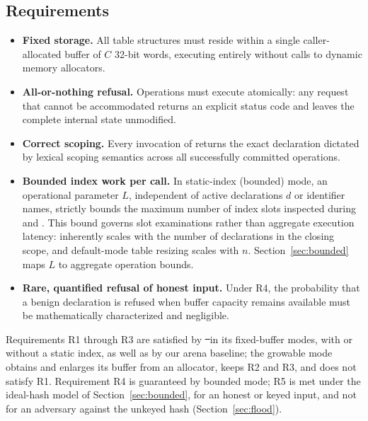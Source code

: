\subsection{Requirements}
\label{sec:requirements}
\begin{itemize}
\item[R1] \textbf{Fixed storage.} All table structures must reside within a single caller-allocated buffer of $C$ 32-bit words, executing entirely without calls to dynamic memory allocators.
\item[R2] \textbf{All-or-nothing refusal.} Operations must execute atomically: any request that cannot be accommodated returns an explicit status code and leaves the complete internal state unmodified.
\item[R3] \textbf{Correct scoping.} Every invocation of  returns the exact declaration dictated by lexical scoping semantics across all successfully committed operations.
\item[R4] \textbf{Bounded index work per call.} In static-index (bounded) mode, an operational parameter $L$, independent of active declarations $d$ or identifier names, strictly bounds the maximum number of index slots inspected during  and . This bound governs slot examinations rather than aggregate execution latency:  inherently scales with the number of declarations in the closing scope, and default-mode table resizing scales with $n$. Section~\ref{sec:bounded} maps $L$ to aggregate operation bounds.
\item[R5] \textbf{Rare, quantified refusal of honest input.} Under R4, the probability that a benign declaration is refused when buffer capacity remains available must be mathematically characterized and negligible.
\end{itemize}
Requirements R1 through R3 are satisfied by \st\ in its fixed-buffer modes, with or without a static index, as well as by our arena baseline; the growable mode obtains and enlarges its buffer from an allocator, keeps R2 and R3, and does not satisfy R1. Requirement R4 is guaranteed by bounded mode; R5 is met under the ideal-hash model of Section~\ref{sec:bounded}, for an honest or keyed input, and not for an adversary against the unkeyed hash (Section~\ref{sec:flood}).

